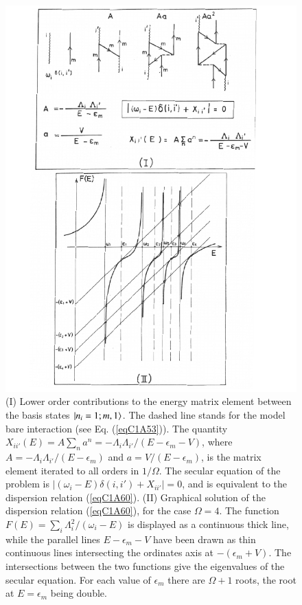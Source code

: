     \begin{figure}
    \centerline {
    \includegraphics*[width=12cm]{introduccion/figs/fig21}
    }
    \caption[Lower order contributions to the energy matrix element between the basis states $\ket{n_i=1;m,1}$ and graphical solution of the dispersion relation.]{(I) Lower order contributions to the energy matrix element between the basis states $\ket{n_i=1;m,1}$. The dashed line stands for the model bare interaction (see Eq. (\ref{eqC1A53})). The quantity $X_{ii'}(E)=A\sum_na^n=-\Lambda_i\Lambda_{i'}/(E-\epsilon_m-V)$, where $A=-\Lambda_i\Lambda_{i'}/(E-\epsilon_m)$ and $a=V/(E-\epsilon_m)$, is the matrix element iterated to all orders in $1/\Omega$. The secular equation of the problem is $|(\omega_i-E)\delta(i,i')+X_{ii'}|=0$, and is equivalent to the dispersion relation (\ref{eqC1A60}). (II) Graphical solution of the dispersion relation (\ref{eqC1A60}), for the case $\Omega=4$. The function $F(E)=\sum_i\Lambda_i^2/(\omega_i-E)$ is displayed as a continuous thick line, while the parallel lines $E-\epsilon_m-V$ have been drawn as thin continuous lines intersecting the ordinates axis at $-(\epsilon_m+V)$. The intersections between the two functions give the eigenvalues of the secular equation. For each value of $\epsilon_m$ there are $\Omega+1$ roots, the root at $E=\epsilon_m$ being double.}
    \label{figC1A4}
    \end{figure}
